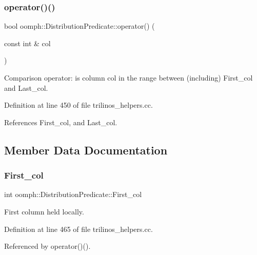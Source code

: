 \subsubsection{\texorpdfstring{operator()()}{operator()()}}
{\footnotesize\ttfamily bool oomph\+::\+Distribution\+Predicate\+::operator() (\begin{DoxyParamCaption}\item[{const int \&}]{col }\end{DoxyParamCaption})\hspace{0.3cm}{\ttfamily [inline]}}



Comparison operator\+: is column col in the range between (including) First\+\_\+col and Last\+\_\+col. 



Definition at line 450 of file trilinos\+\_\+helpers.\+cc.



References First\+\_\+col, and Last\+\_\+col.



\subsection{Member Data Documentation}
\mbox{\label{classoomph_1_1DistributionPredicate_a832f10468911bf3bd8323dc6bdaf10f4}} 
\subsubsection{\texorpdfstring{First\+\_\+col}{First\_col}}
{\footnotesize\ttfamily int oomph\+::\+Distribution\+Predicate\+::\+First\+\_\+col\hspace{0.3cm}{\ttfamily [private]}}



First column held locally. 



Definition at line 465 of file trilinos\+\_\+helpers.\+cc.



Referenced by operator()().

\mbox{\label{classoomph_1_1DistributionPredicate_a835e3e981b0251f15b3c07d85afe0c3f}} 

